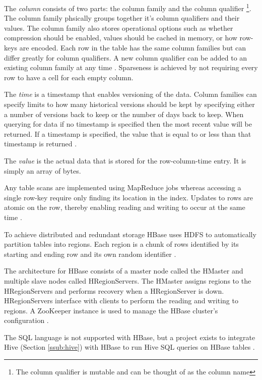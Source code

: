\documentclass[12pt]{article}
\begin{document}
The \textit{column} consists of two parts: the column family and the column qualifier \footnote{The column qualifier is mutable and can be thought of as the column name}. The column family phsically groups together it's column qualifiers and their values. The column family also stores operational options such as whether compression should be enabled, values should be cached in memory, or how row-keys are encoded. Each row in the table has the same column families but can differ greatly for column qualifiers. A new column qualifier can be added to an existing column family at any time \cite{hbasedocs}. Sparseness is achieved by not requiring every row to have a cell for each empty column.

The \textit{time} is a timestamp that enables versioning of the data. Column families can specify limits to how many historical versions should be kept by specifying either a number of versions back to keep or the number of days back to keep. When querying for data if no timestamp is specified then the most recent value will be returned. If a timestamp is specified, the value that is equal to or less than that timestamp is returned \cite{hbasedocs,hbasejimbojw}.

The \textit{value} is the actual data that is stored for the row-column-time entry. It is simply an array of bytes.

Any table scans are implemented using MapReduce jobs whereas accessing a single row-key require only finding its location in the index. Updates to rows are atomic on the row, thereby enabling reading and writing to occur at the same time \cite{hbaseanalysis}.

To achieve distributed and redundant storage HBase uses HDFS to automatically partition tables into regions. Each region is a chunk of rows identified by its starting and ending row and its own random identifier \cite{hbaseanalysis}.

The architecture for HBase consists of a master node called the HMaster and multiple slave nodes called HRegionServers. The HMaster assigns regions to the HRegionServers and performs recovery when a HRegionServer is down. HRegionServers interface with clients to perform the reading and writing to regions. A ZooKeeper \cite{zookeeper} instance is used to manage the HBase cluster's configuration \cite{hbaseanalysis}.

The SQL language is not supported with HBase, but a project exists to integrate Hive (Section \ref{ssub:hive}) with HBase to run Hive SQL queries on HBase tables \cite{hivehbaseintegration}.
\end{document}

